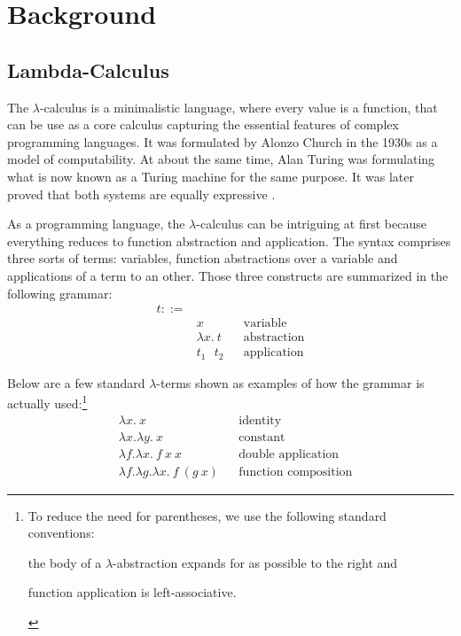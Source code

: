 \section{Background}
\label{sec:background}

\subsection{Lambda-Calculus}
\label{sec:background-lambda-calculus}

The $\lambda$-calculus is a minimalistic language, where every value is a function, that can be use
as a core calculus capturing the essential features of complex programming
languages. It was formulated by Alonzo Church \cite{church-1936-unsolvable-problem} in
the 1930s as a model of computability. At about the same time, Alan Turing was
formulating what is now known as a Turing machine
\cite{turing-1936-on-computable-numbers} for the same purpose. It was later
proved that both systems are equally expressive
\cite{turing-1937-computability}.

As a programming language, the $\lambda$-calculus can be intriguing at first because everything
reduces to function abstraction and application. The syntax comprises three sorts of terms:
variables, function abstractions over a variable and applications of a term to an other. Those three
constructs are summarized in the following grammar:
\begin{align*}
  t ::= & \\
    & x && \text{variable} \\
    & \lambda x. \ t && \text{abstraction} \\
    & t_1 \text{ } t_2 && \text{application}
\end{align*}

Below are a few standard $\lambda$-terms shown as examples of how the grammar is actually
used:\footnote{To reduce the need for parentheses, we use the following standard conventions:
\begin{enumerate*}[label=(\arabic*)]
  \item the body of a $\lambda$-abstraction expands for as possible to the right and
  \item function application is left-associative.
\end{enumerate*}}
\begin{align*}
  & \lambda x. \ x && \text{identity} \\
  & \lambda x. \lambda y. \ x && \text{constant} \\
  & \lambda f. \lambda x. \ f \ x \ x && \text{double application} \\
  & \lambda f. \lambda g. \lambda x. \ f \ (g \ x) && \text{function composition}
\end{align*}

